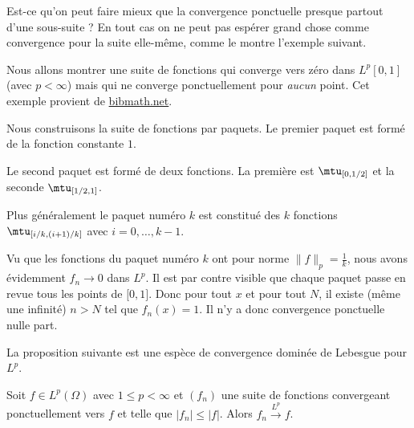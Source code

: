 Est-ce qu'on peut faire mieux que la convergence ponctuelle presque partout d'une sous-suite ? En tout cas on ne peut pas espérer grand chose comme convergence pour la suite elle-même, comme le montre l'exemple suivant.

\begin{example} \label{ExPOmxICc}
    Nous allons montrer une suite de fonctions qui converge vers zéro dans \( L^p[0,1]\) (avec \( p<\infty\)) mais qui ne converge ponctuellement pour \emph{aucun} point. Cet exemple provient de \href{http://www.bibmath.net/dico/index.php?action=affiche&quoi=./b/bosseglissante.html}{bibmath.net}.


    Nous construisons la suite de fonctions par paquets. Le premier paquet est formé de la fonction constante \( 1\).

    Le second paquet est formé de deux fonctions. La première est \( \mtu_{\mathopen[0 , 1/2 \mathclose]}\) et la seconde \( \mtu_{\mathopen[ 1/2 , 1 \mathclose]}\).

    Plus généralement le paquet numéro \( k\) est constitué des \( k\) fonctions \( \mtu_{\mathopen[ i/k , (i+1)/k \mathclose]}\) avec \( i=0,\ldots, k-1\).

    Vu que les fonctions du paquet numéro \( k\) ont pour norme \( \| f \|_p=\frac{1}{ k }\), nous avons évidemment \( f_n\to 0\) dans \( L^p\). Il est par contre visible que chaque paquet passe en revue tous les points de \( \mathopen[ 0 , 1 \mathclose]\). Donc pour tout \( x\) et pour tout \( N\), il existe (même une infinité) \( n>N\) tel que \( f_n(x)=1\). Il n'y a donc convergence ponctuelle nulle part.
\end{example}

La proposition suivante est une espèce de convergence dominée de Lebesgue pour \( L^p\).
\begin{proposition} \label{PropBVHXycL}
    Soit \( f\in L^p(\Omega)\) avec \( 1\leq p<\infty\) et \( (f_n)\) une suite de fonctions convergeant ponctuellement vers \( f\) et telle que \( | f_n |\leq | f |\). Alors \( f_n\stackrel{L^p}{\longrightarrow}f\).
\end{proposition}

